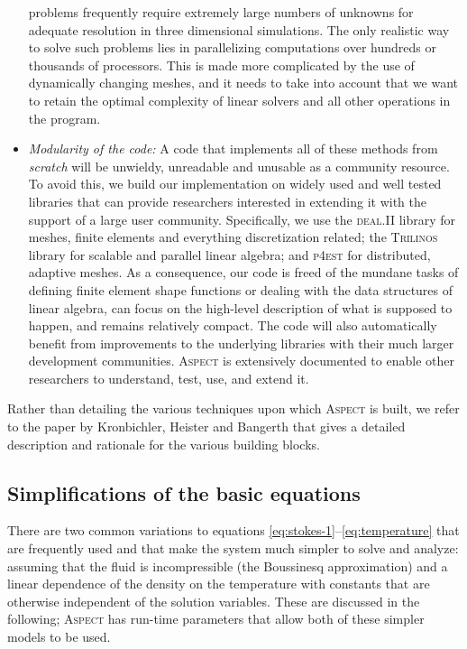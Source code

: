 \documentclass{article}
\newcommand{\dealii}{{\textsc{deal.II}}}
\newcommand{\pfrst}{{\normalfont\textsc{p4est}}}
\newcommand{\trilinos}{{\textsc{Trilinos}}}
\newcommand{\aspect}{\textsc{Aspect}}
\begin{document}
\begin{itemize}
  problems frequently require extremely large numbers of unknowns for
  adequate resolution in three dimensional simulations. The only realistic way to solve such problems lies in
  parallelizing computations over hundreds or thousands of processors. This is
  made more complicated by the use of dynamically changing meshes, and it
  needs to take into account that we want to retain the optimal complexity of
  linear solvers and all other operations in the program.
\item \textit{Modularity of the code:} A code that implements all of these
  methods from \textit{scratch} will be unwieldy, unreadable and unusable as a community
  resource. To avoid this, we build our implementation on widely used and well
  tested libraries that can provide researchers interested in extending it
  with the support of a large user community. Specifically, we use the
  \dealii{} library \cite{BHK07,BK99m} for meshes, finite
  elements and everything discretization related; the \trilinos{} library
  \cite{trilinos,trilinos-web-page} for scalable and parallel linear algebra;
  and \pfrst{} \cite{p4est} for distributed, adaptive meshes. As a
  consequence, our code is freed of the mundane tasks of defining finite
  element shape functions or dealing with the data structures of linear algebra,
  can focus on the high-level description of what is supposed to happen, and
  remains relatively compact. The code will also
  automatically benefit from improvements to the underlying libraries with
  their much larger development communities. \aspect{} is extensively
  documented to enable other researchers to understand, test, use, and extend it.
\end{itemize}

Rather than detailing the various techniques upon which \aspect{} is built, we
refer to the paper by Kronbichler, Heister and Bangerth \cite{KHB12} that
gives a detailed description and rationale for the various building blocks.


\subsection{Simplifications of the basic equations}

There are two common variations to equations
\eqref{eq:stokes-1}--\eqref{eq:temperature} that are frequently used and that
make the system much simpler to solve and analyze: assuming that the fluid is
incompressible (the Boussinesq approximation) and a linear dependence of the
density on the temperature with constants that are otherwise independent of
the solution variables. These are
discussed in the following; \aspect{} has
run-time parameters that allow both of these simpler models to be used.
\end{document}
